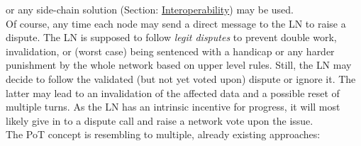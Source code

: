 or any side-chain solution (Section: \hyperref[sec:Interoperability]{Interoperability}) may be used.\\
Of course, any time each node may send a direct message to the \gls{LN} to raise a dispute.
The \gls{LN} is supposed to follow \textit{legit disputes} to prevent double work,
invalidation, or (worst case) being sentenced with a handicap or any harder punishment by the whole network based on upper level rules.
Still, the \gls{LN} may decide to follow the validated (but not yet voted upon) dispute or ignore it.
The latter may lead to an invalidation of the affected data and a possible reset of multiple turns.
As the \gls{LN} has an intrinsic incentive for progress, it will most likely give in to a dispute call and raise a network vote upon the issue. \\
The \gls{PoT} concept is resembling to multiple, already existing approaches:
